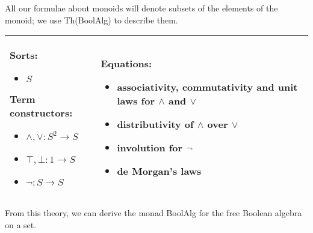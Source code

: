 \documentclass{llncs}
\newcommand{\maps}{\colon}
\begin{document}
All our formulae about monoids will denote subsets of the elements of the monoid; we use Th(BoolAlg) to describe them.  \begin{center}
  \begin{longtable}{|p{0.3\linewidth}|p{0.7\linewidth}|}
    \hline
    Sorts:
    \begin{itemize}
      \item $S$
    \end{itemize}
    Term constructors:
    \begin{itemize}
      \item $\land, \lor\maps S^2 \to S$
      \item $\top, \bot\maps 1 \to S$
      \item $\neg\maps S \to S$
    \end{itemize}
    &
    Equations:
    \begin{itemize}
      \item \raggedright associativity, commutativity and unit laws for $\land$ and $\lor$
      \item distributivity of $\land$ over $\lor$
      \item involution for $\neg$
      \item de Morgan's laws
    \end{itemize}\\
    \hline
  \end{longtable}
\end{center}
From this theory, we can derive the monad BoolAlg for the free Boolean algebra on a set.
\end{document}
